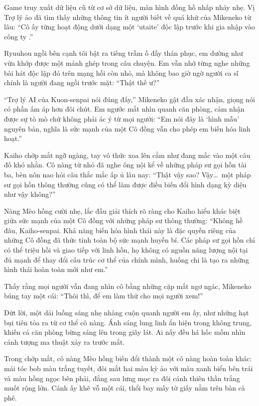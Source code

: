 ﻿\documentclass[../main.tex]{subfiles}
\begin{document}
Game truy xuất dữ liệu cũ từ cơ sở dữ liệu, màn hình đồng hồ nhấp nháy nhẹ. Vị Trợ lý ảo đã tìm thấy những thông tin ít người biết về quá khứ của Mikeneko từ lâu: ``Cô ấy từng hoạt động dưới dạng một `utaite' độc lập trước khi gia nhập vào công ty \hll.''

Ryuuhou ngồi bên cạnh tôi bật ra tiếng trầm ồ đầy thán phục, em dường như vừa khớp được một mảnh ghép trong câu chuyện. Em vẫn nhớ từng nghe những bài hát độc lập đó trên mạng hồi còn nhỏ, mà không bao giờ ngờ người ca sĩ chính là người đang ngồi trước mặt: ``Thật thế ư?''

``Trợ lý AI của Kuon-senpai nói đúng đấy,'' Mikeneko gật đầu xác nhận, giọng nói có phần ấm áp hơn đôi chút. Em ngước mắt nhìn quanh căn phòng, cảm nhận được sự tò mò chứ không phải ác ý từ mọi người: ``Em nói đây là `hình mẫu' nguyên bản, nghĩa là sức mạnh của một Cô đồng vẫn cho phép em biến hóa linh hoạt.''

Kaiho chớp mắt ngỡ ngàng, tay vô thức xoa lên cằm như đang mắc vào một câu đố khó nhằn. Cô nàng từ nhỏ đã nghe ông nội kể về những pháp sư gọi hồn tài ba, bèn nôn nao hỏi câu thắc mắc ấp ủ lâu nay: ``Thật vậy sao? Vậy\dots\ một pháp sư gọi hồn thông thường cũng có thể làm được điều biến đổi hình dạng kỳ diệu như vậy không?''

Nàng Mèo hồng cười nhẹ, lắc đầu giải thích rõ ràng cho Kaiho hiểu khác biệt giữa sức mạnh của một Cô đồng với những pháp sư thông thường: ``Không hề đâu, Kaiho-senpai. Khả năng biến hóa hình thái này là đặc quyền riêng của những Cô đồng đã thức tỉnh toàn bộ sức mạnh huyền bí. Các pháp sư gọi hồn chỉ có thể triệu hồi và giao tiếp với linh hồn, họ không có nguồn năng lượng nội tại đủ mạnh để thay đổi cấu trúc cơ thể của chính mình, huống chi là tạo ra những hình thái hoàn toàn mới như em.''

Thấy rằng mọi người vẫn đang nhìn cô bằng những cặp mắt ngơ ngác, Mikeneko búng tay một cái: ``Thôi thì, để em làm thử cho mọi người xem!''

Dứt lời, một dải luồng sáng nhẹ nhàng cuộn quanh người em ấy, như những hạt bụi tiên tỏa ra từ cơ thể cô nàng. Ánh sáng lung linh ẩn hiện trong không trung, khiến cả căn phòng bừng sáng lên trong giây lát. Ai nấy đều há hốc mồm nhìn cảnh tượng ma thuật xảy ra trước mắt.

Trong chớp mắt, cô nàng Mèo hồng biến đổi thành một cô nàng hoàn toàn khác: mái tóc bob màu trắng tuyết, đôi mắt hai màu kỳ ảo với màu xanh biển bên trái và màu hồng ngọc bên phải, đằng sau lưng mọc ra đôi cánh thiên thần trắng muốt rộng lớn. Cánh ấy khẽ vỗ một cái, thổi bay mấy tờ giấy nằm trên bàn cà phê.
\end{document}
